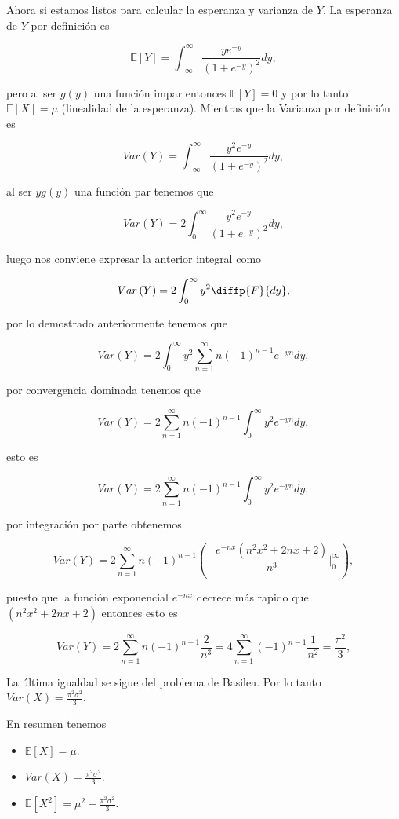 \documentclass[letterpaper]{article}
\theoremstyle{definition}
\theoremstyle{lemathm}
\theoremstyle{lemathm}
\theoremstyle{lemathm}
\theoremstyle{lemademthm}
\newcommand{\pars}[1]{\left( #1 \right) }
\newcommand{\bracs}[1]{\left[ #1 \right] }
\newcommand{\EE}{\mathbb{E}}
\newcommand{\1}{\mathbbm{1}}
\begin{document}
\begin{enumerate}
\begin{enumerate}
			Ahora si estamos listos para calcular la esperanza y varianza de $Y$. La esperanza de $Y$ por definición es

			\[\EE\bracs{Y} = \int_{-\infty}^{\infty} \frac{ye^{-y}}{\pars{1+e^{-y}}^2} dy,\]

			pero al ser $g(y)$ una función impar entonces $\EE\bracs{Y} = 0$ y por lo tanto $\EE\bracs{X} = \mu$ (linealidad de la esperanza). Mientras que la Varianza por definición es

			\[Var\pars{Y} = \int_{-\infty}^{\infty} \frac{y^2e^{-y}}{\pars{1+e^{-y}}^2} dy,\]

			al ser $yg(y)$ una función par tenemos que

			\[Var\pars{Y} = 2\int_{0}^{\infty} \frac{y^2e^{-y}}{\pars{1+e^{-y}}^2} dy,\]

			luego nos conviene expresar la anterior integral como

			\[Var\pars{Y} = 2\int_{0}^{\infty} y^2 \diffp{F}{dy},\]

			por lo demostrado anteriormente tenemos que

			\[Var\pars{Y} = 2\int_{0}^{\infty} y^2 \sum_{n=1}^{\infty} n (-1)^{n-1} e^{-yn} dy,\]

			por convergencia dominada tenemos que

			\[Var\pars{Y} = 2 \sum_{n=1}^{\infty} n (-1)^{n-1} \int_{0}^{\infty} y^2 e^{-yn} dy,\]

			esto es

			\[Var\pars{Y} = 2 \sum_{n=1}^{\infty} n (-1)^{n-1} \int_{0}^{\infty} y^2 e^{-yn} dy,\]

			por integración por parte obtenemos

			\[Var\pars{Y} = 2 \sum_{n=1}^{\infty} n (-1)^{n-1} \pars{-\frac{e^{-nx}\pars{n^2x^2+2nx+2}}{n^3}\bigg\rvert_{0}^{\infty}},\]

			puesto que la función exponencial $e^{-nx}$ decrece más rapido que $\pars{n^2x^2+2nx+2}$ entonces esto es

			\[Var\pars{Y} = 2 \sum_{n=1}^{\infty} n (-1)^{n-1} \frac{2}{n^3} = 4 \sum_{n=1}^{\infty} (-1)^{n-1} \frac{1}{n^2} = \frac{\pi^2}{3},\]

			La última igualdad se sigue del problema de Basilea. Por lo tanto $Var(X) = \frac{\pi^2\sigma^2}{3}$.

			En resumen tenemos

			\begin{itemize}
				\item $\EE\bracs{X} = \mu$.
				\item $Var\pars{X} = \frac{\pi^2\sigma^2}{3}$.
				\item $\EE\bracs{X^2} = \mu^2 + \frac{\pi^2\sigma^2}{3}$.
			\end{itemize}


\end{enumerate}
\end{enumerate}
\end{document}

